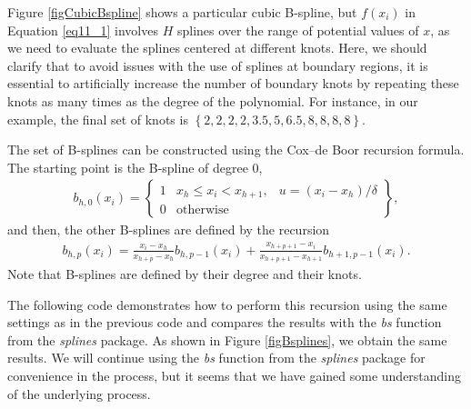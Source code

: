 Figure \ref{figCubicBspline} shows a particular cubic B-spline, but \( f(x_i) \) in Equation \ref{eq11_1} involves \( H \) splines over the range of potential values of \( x \), as we need to evaluate the splines centered at different knots. Here, we should clarify that to avoid issues with the use of splines at boundary regions, it is essential to artificially increase the number of boundary knots by repeating these knots as many times as the degree of the polynomial. For instance, in our example, the final set of knots is \( \left\{2, 2, 2, 2, 3.5, 5, 6.5, 8, 8, 8, 8\right\} \). %

The set of B-splines can be constructed using the Cox–de Boor recursion formula. The starting point is the B-spline of degree 0,
\begin{align*}
		b_{h,0}(x_i)=\begin{Bmatrix}
		1 & x_h \leq x_i < x_{h+1}, & u=(x_i-x_h)/\delta\\
		0 & \text{otherwise}
	\end{Bmatrix},
\end{align*}
and then, the other B-splines are defined by the recursion
\begin{align}
	b_{h,p}(x_i)=\frac{x_i-x_{h}}{x_{h+p}-x_h}b_{h,p-1}(x_i)+\frac{x_{h+p+1}-x_i}{x_{h+p+1}-x_{h+1}}b_{h+1,p-1}(x_i).
\end{align}
Note that B-splines are defined by their degree and their knots.

The following code demonstrates how to perform this recursion using the same settings as in the previous code and compares the results with the \textit{bs} function from the \textit{splines} package. As shown in Figure \ref{figBsplines}, we obtain the same results. We will continue using the \textit{bs} function from the \textit{splines} package for convenience in the process, but it seems that we have gained some understanding of the underlying process.

